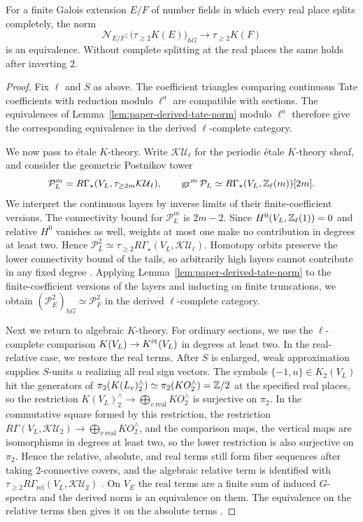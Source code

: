 \begin{proposition}\label{prop:paper-derived-norm}
For a finite Galois extension $E/F$ of number fields in which every real place splits completely, the norm
\[
  \mathcal N_{E/F}:\bigl(\tau_{\ge2}K(E)\bigr)_{hG}\longrightarrow \tau_{\ge2}K(F)
\]
is an equivalence.
Without complete splitting at the real places the same holds after inverting $2$.
\end{proposition}
\begin{proof}
Fix $\ell$ and $S$ as above.
The coefficient triangles comparing continuous Tate coefficients with reduction modulo $\ell^a$ are compatible with sections.
The equivalences of Lemma~\ref{lem:paper-derived-tate-norm} modulo $\ell^a$ therefore give the corresponding equivalence in the derived $\ell$-complete category.

We now pass to \'etale $K$-theory.
Write $\mathcal{KU}_\ell$ for the periodic \'etale $K$-theory sheaf, and consider the geometric Postnikov tower
\[
  \mathcal P_L^m=R\Gamma_\star(V_L,\tau_{\ge2m}\mathcal{KU}_\ell),
  \qquad
  \operatorname{gr}^m\mathcal P_L \simeq R\Gamma_\star(V_L,\mathbb Z_\ell(m))[2m].
\]
We interpret the continuous layers by inverse limits of their finite-coefficient versions.
The connectivity bound for $\mathcal P_L^m$ is $2m-2$.
Since $H^0(V_L,\mathbb Z_\ell(1))=0$ and relative $H^0$ vanishes as well, weights at most one make no contribution in degrees at least two.
Hence $\mathcal P_L^2\simeq\tau_{\ge2}R\Gamma_\star(V_L,\mathcal{KU}_\ell)$.
Homotopy orbits preserve the lower connectivity bound of the tails, so arbitrarily high layers cannot contribute in any fixed degree \cite{ClausenMathew}.
Applying Lemma~\ref{lem:paper-derived-tate-norm} to the finite-coefficient versions of the layers and inducting on finite truncations, we obtain $(\mathcal P_E^2)_{hG}\simeq\mathcal P_F^2$ in the derived $\ell$-complete category.

Next we return to algebraic $K$-theory.
For ordinary sections, we use the $\ell$-complete comparison $K(V_L)\to K^{\mathrm{\acute et}}(V_L)$ in degrees at least two.
In the real-relative case, we restore the real terms.
After $S$ is enlarged, weak approximation supplies $S$-units $u$ realizing all real sign vectors.
The symbols $\{-1,u\}\in K_2(V_L)$ hit the generators of $\pi_2(K(L_v)^\wedge_2)\simeq\pi_2(KO^\wedge_2)=\mathbb Z/2$ at the specified real places, so the restriction $K(V_L)^\wedge_2\to\bigoplus_{v\ \mathrm{real}}KO^\wedge_2$ is surjective on $\pi_2$.
In the commutative square formed by this restriction, the restriction $R\Gamma(V_L,\mathcal{KU}_2)\to\bigoplus_{v\ \mathrm{real}}KO^\wedge_2$, and the comparison maps, the vertical maps are isomorphisms in degrees at least two, so the lower restriction is also surjective on $\pi_2$.
Hence the relative, absolute, and real terms still form fiber sequences after taking $2$-connective covers, and the algebraic relative term is identified with $\tau_{\ge2}R\Gamma_{\mathrm{rel}}(V_L,\mathcal{KU}_2)$ \cite[Theorems 7.12--7.13]{ClausenMathew}.
On $V_E$ the real terms are a finite sum of induced $G$-spectra and the derived norm is an equivalence on them.
The equivalence on the relative terms then gives it on the absolute terms \cite{RognesWeibel,ClausenMathew}.


\end{proof}
